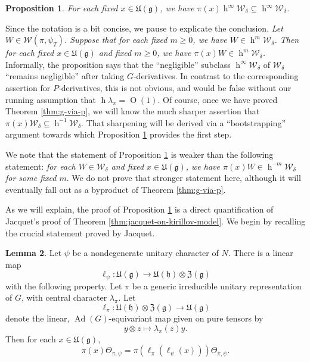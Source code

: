 \documentclass[reqno]{amsart}
\DeclareMathOperator{\Ad}{Ad}
\DeclareMathOperator{\h}{h}
\def\O{\operatorname{O}}
\theoremstyle{plain} \newtheorem{theorem} {Theorem}
\newtheorem{proposition} [theorem] {Proposition}
\theoremstyle{definition} \newtheorem{definition} [theorem] {Definition}
\theoremstyle{itplain} %
\newtheorem{lemma}[theorem]{Lemma}
\numberwithin{equation}{section}
\numberwithin{theorem}{section}
\renewcommand{\geq}{\geqslant}
\begin{document}
\begin{proposition}\label{prop:standard2:each-fixed-x}
  For each fixed $x \in \mathfrak{U}(\mathfrak{g})$, we have $\pi(x) \h^\infty \mathcal{W}_\delta \subseteq \h^\infty \mathcal{W}_\delta$.
\end{proposition}
\begin{remark}
  Since the notation is a bit concise, we pause to explicate the conclusion.  \emph{Let $W \in \mathcal{W}(\pi,\psi_T)$.  Suppose that for each fixed $m \geq 0$, we have $W \in \h^m \mathcal{W}_\delta$.  Then for each fixed $x \in \mathfrak{U}(\mathfrak{g})$ and fixed $m \geq 0$, we have $\pi(x) W \in \h^m \mathcal{W}_\delta$.}  Informally, the proposition says that the ``negligible'' subclass $\h^\infty \mathcal{W}_\delta$ of $\mathcal{W}_\delta$ ``remains negligible'' after taking $G$-derivatives.  In contrast to the corresponding assertion for $P$-derivatives, this is not obvious, and would be false without our running assumption that $\h \lambda_\pi = \O(1)$.  Of course, once we have proved Theorem \ref{thm:g-via-p}, we will know the much sharper assertion that $\pi(x) \mathcal{W}_\delta \subseteq \h^{-1} \mathcal{W}_\delta$.  That sharpening will be derived via a ``bootstrapping'' argument towards which Proposition \ref{prop:standard2:each-fixed-x} provides the first step.

  We note that the statement of Proposition \ref{prop:standard2:each-fixed-x} is weaker than the following statement: \emph{for each $W \in \mathcal{W}_\delta$ and fixed $x \in \mathfrak{U}(\mathfrak{g})$, we have $\pi(x) W \in \h^{-m} \mathcal{W}_\delta$ for some fixed $m$}.  We do not prove that stronger statement here, although it will eventually fall out as a byproduct of Theorem \ref{thm:g-via-p}.
\end{remark}
As we will explain, the proof of Proposition \ref{prop:standard2:each-fixed-x} is a direct quantification of Jacquet's proof of Theorem \ref{thm:jacquet-on-kirillov-model}.  We begin by recalling the crucial statement proved by Jacquet.
\begin{lemma}
  Let $\psi$ be a nondegenerate unitary character of $N$.  There is a linear map
\begin{equation*}
  \ell_{\psi} : \mathfrak{U}(\mathfrak{g}) \rightarrow \mathfrak{U}(\mathfrak{h}) \otimes \mathfrak{Z}(\mathfrak{g})
\end{equation*}
with the following property.  Let $\pi$ be a generic irreducible unitary representation of $G$, with central character $\lambda_\pi$.  Let
\begin{equation*}
  \ell_\pi : \mathfrak{U}(\mathfrak{h}) \otimes \mathfrak{Z}(\mathfrak{g}) \rightarrow \mathfrak{U}(\mathfrak{g})
\end{equation*}
denote the linear, $\Ad(G)$-equivariant map given on pure tensors by
\begin{equation*}
  y \otimes z \mapsto \lambda_\pi(z) y.
\end{equation*}
Then for each $x \in \mathfrak{U}(\mathfrak{g})$,
\begin{equation}\label{eq:pix-theta_pi-psi}
  \pi(x) \Theta_{\pi,\psi} = \pi(\ell_{\pi}(\ell_\psi(x))) \Theta_{\pi,\psi}.
\end{equation}
\end{lemma}
\end{document}
